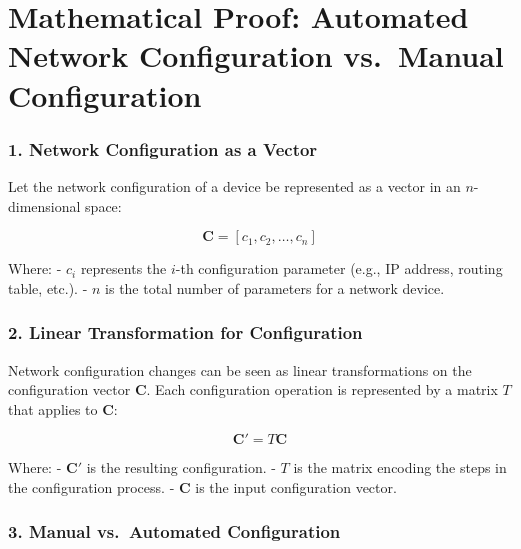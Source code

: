 \documentclass[11pt]{article}
\begin{document}
    \hypertarget{mathematical-proof-automated-network-configuration-vs.-manual-configuration}{%
\section{Mathematical Proof: Automated Network Configuration vs.~Manual
Configuration}\label{mathematical-proof-automated-network-configuration-vs.-manual-configuration}}

\hypertarget{network-configuration-as-a-vector}{%
\subsubsection{1. Network Configuration as a
Vector}\label{network-configuration-as-a-vector}}

Let the network configuration of a device be represented as a vector in
an \(n\)-dimensional space:

\[
\mathbf{C} = [c_1, c_2, \dots, c_n]
\]

Where: - \(c_i\) represents the \(i\)-th configuration parameter (e.g.,
IP address, routing table, etc.). - \(n\) is the total number of
parameters for a network device.

\hypertarget{linear-transformation-for-configuration}{%
\subsubsection{2. Linear Transformation for
Configuration}\label{linear-transformation-for-configuration}}

Network configuration changes can be seen as linear transformations on
the configuration vector \(\mathbf{C}\). Each configuration operation is
represented by a matrix \(T\) that applies to \(\mathbf{C}\):

\[
\mathbf{C'} = T \mathbf{C}
\]

Where: - \(\mathbf{C'}\) is the resulting configuration. - \(T\) is the
matrix encoding the steps in the configuration process. - \(\mathbf{C}\)
is the input configuration vector.

\hypertarget{manual-vs.-automated-configuration}{%
\subsubsection{3. Manual vs.~Automated
Configuration}\label{manual-vs.-automated-configuration}}
\end{document}
